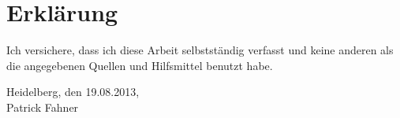 \chapter*{Erklärung}

Ich versichere, dass ich diese Arbeit selbstständig verfasst und keine anderen als die angegebenen Quellen und Hilfsmittel benutzt habe. \\
\vspace{0.2cm}
\begin{flushleft}
Heidelberg, den 19.08.2013,\\
\vspace{2cm}
Patrick Fahner
\end{flushleft}

